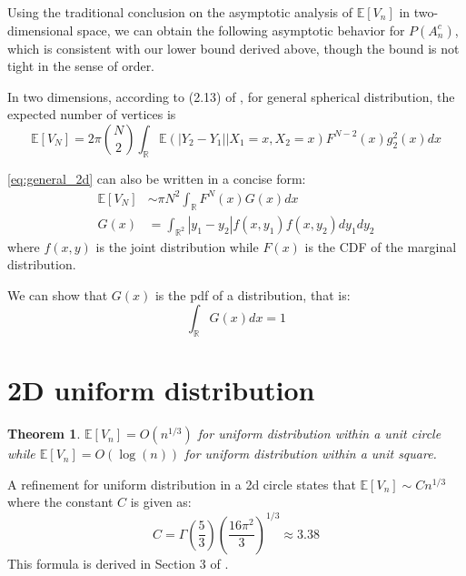 \documentclass{article}
\newtheorem{theorem}{Theorem}
\def\E{\mathbb{E}}
\def\R{\mathbb{R}}
\begin{document}
Using the traditional conclusion on the
asymptotic analysis of $\E[V_n]$
in two-dimensional space,
we can obtain the following
asymptotic behavior for $P(A_n^c)$,
which is consistent with our lower bound
derived above, though the bound is
not tight in the sense of order.


In two dimensions, according to (2.13) of \cite{efron1965convex},
for general spherical distribution,
the expected number of vertices is
\begin{equation}\label{eq:general_2d}
    \E [V_N] = 2\pi \binom{N}{2}
    \int_{\R}\E(|Y_2-Y_1| \Big\vert X_1= x, X_2=x)
    F^{N-2}(x) g^2_2(x)dx
\end{equation}

\eqref{eq:general_2d}
can also be written in a concise form:
\begin{align}
    \E[V_N] & \sim \pi N^2 \int_{\R}F^N(x)G(x)dx 
    \label{eq:E_V_N_F_N_G}\\
    G(x) & = \int_{\R^2} |y_1-y_2| f(x,y_1)f(x,y_2)
    dy_1dy_2
    \label{eq:G_x_y_1_y_2_f}
\end{align}
where $f(x,y)$ is the joint distribution while $F(x)$ is the CDF
of the marginal distribution.

We can show that $G(x)$ is the pdf of a distribution,
that is:
\begin{equation}
    \int_{\R} G(x) dx = 1
\end{equation}

\section{2D uniform distribution}
\begin{theorem}
    $\E[V_n] = O(n^{1/3})$ for uniform distribution
    within a unit circle while
    $\E[V_n] = O(\log(n))$ for uniform distribution
    within a unit square.
\end{theorem}
A refinement for uniform distribution in a 2d circle states that $\E[V_n] \sim C n^{1/3}$ where
the constant $C$ is given as:
\begin{equation}\label{eq:Cn3}
    C = \Gamma\left(\frac{5}{3}\right) \left(\frac{16\pi^2}{3}
    \right)^{1/3} \approx 3.38
\end{equation}
This formula is derived in
Section 3 of \cite{renyi1963konvexe}.
\end{document}
